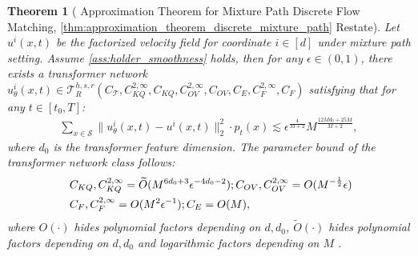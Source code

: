 \documentclass[12pt]{article}
\numberwithin{equation}{section}
\let\tilde\widetilde
\newcommand{\wt}{\widetilde}
\renewcommand{\tilde}{\wt}
\theoremstyle{theoremstyle}
\newtheorem{theorem}{Theorem}[section]
\numberwithin{equation}{section}
\numberwithin{theorem}{section}
\numberwithin{proposition}{section}
\numberwithin{definition}{section}
\numberwithin{lemma}{section}
\numberwithin{assumption}{section}
\numberwithin{remark}{section}
\begin{document}
\begin{theorem}[
Approximation Theorem for Mixture Path Discrete Flow Matching, \cref{thm:approximation_theorem_discrete_mixture_path} Restate]
\label{thm:approximation_theorem_discrete_mixture_path_re}
Let $u^i(x,t)$ be the factorized velocity field for coordinate $i \in [d]$ under mixture path setting.
Assume \cref{ass:holder_smoothness} holds,
then for any $\epsilon \in (0,1)$, there exists a transformer network $u^i_\theta(x,t)\in\mathcal{T}^{h,s,r}_R(C_\mathcal{T},C^{2,\infty}_{KQ},C_{KQ},C^{2,\infty}_{OV},C_{OV},C_{E},C^{2,\infty}_{F},C_{F})$ satisfying that for any $t\in[t_0,T]$:
\begin{align*}
    \sum_{x\in \mathcal{S}}\|u^i_\theta(x,t)-u^i(x,t)\|^2_2\cdot p_t(x) \lesssim  \epsilon^\frac{4}{M+2}M^{\frac{12Md_0+25M}{M+2}},
\end{align*}
where $d_0$ is the transformer feature dimension.
The parameter bound of the transformer network class follows:
\begin{align*}
    & ~C_{KQ},C^{2,\infty}_{KQ}=\tilde{O}(M^{6d_0+3}\epsilon^{-4d_0-2});C_{OV},C^{2,\infty}_{OV}=O(M^{-\frac{1}{2}}\epsilon) \notag\\
    & ~C_{F},C^{2,\infty}_{F}=O(M^2\epsilon^{-1});C_E=O(M),
\end{align*}
where $O(\cdot)$ hides polynomial factors depending on $d,d_0$, $\tilde{O}(\cdot)$ hides polynomial factors depending on $d,d_0$ and logarithmic factors depending on $M$ .
\end{theorem}
\end{document}
